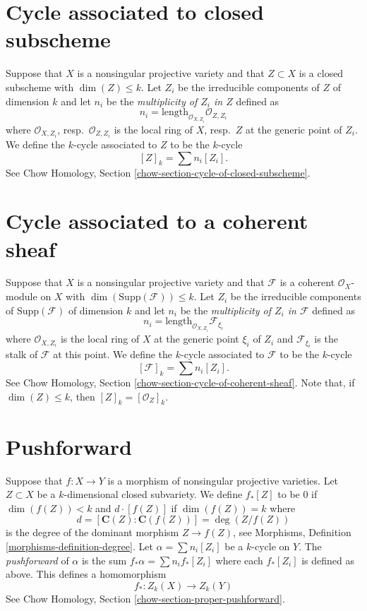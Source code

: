 \section{Cycle associated to closed subscheme}
\label{section-cycle-of-closed}

\noindent
Suppose that $X$ is a nonsingular projective variety and that $Z \subset X$
is a closed subscheme with $\dim(Z) \leq k$. Let $Z_i$ be the irreducible
components of $Z$ of dimension $k$ and let $n_i$ be the
{\it multiplicity of $Z_i$ in $Z$} defined as
$$
n_i = \text{length}_{\mathcal{O}_{X, Z_i}} \mathcal{O}_{Z, Z_i}
$$
where $\mathcal{O}_{X, Z_i}$, resp.\ $\mathcal{O}_{Z, Z_i}$ is the
local ring of $X$, resp.\ $Z$ at the generic point of $Z_i$.
We define the $k$-cycle associated to $Z$ to be the $k$-cycle
$$
[Z]_k = \sum n_i [Z_i].
$$
See Chow Homology, Section \ref{chow-section-cycle-of-closed-subscheme}.


\section{Cycle associated to a coherent sheaf}
\label{section-cycle-of-coherent-sheaf}

\noindent
Suppose that $X$ is a nonsingular projective variety and that $\mathcal{F}$
is a coherent $\mathcal{O}_X$-module on $X$ with
$\dim(\text{Supp}(\mathcal{F})) \leq k$.
Let $Z_i$ be the irreducible components of $\text{Supp}(\mathcal{F})$
of dimension $k$ and let $n_i$ be the
{\it multiplicity of $Z_i$ in $\mathcal{F}$} defined as
$$
n_i = \text{length}_{\mathcal{O}_{X, Z_i}} \mathcal{F}_{\xi_i}
$$
where $\mathcal{O}_{X, Z_i}$ is the
local ring of $X$ at the generic point $\xi_i$ of $Z_i$
and $\mathcal{F}_{\xi_i}$ is the stalk of $\mathcal{F}$ at this point.
We define the $k$-cycle associated to $\mathcal{F}$ to be the $k$-cycle
$$
[\mathcal{F}]_k = \sum n_i [Z_i].
$$
See Chow Homology, Section \ref{chow-section-cycle-of-coherent-sheaf}.
Note that, if $\dim(Z) \leq k$, then $[Z]_k = [\mathcal{O}_Z]_k$.


\section{Pushforward}
\label{section-pushforward}

\noindent
Suppose that $f : X \to Y$ is a morphism of nonsingular projective varieties.
Let $Z \subset X$ be a $k$-dimensional
closed subvariety. We define $f_*[Z]$ to be $0$ if $\dim(f(Z))<k$
and $d \cdot [f(Z)]$ if $\dim(f(Z)) = k$ where
$$
d = [\mathbf{C}(Z) : \mathbf{C}(f(Z))] = \deg(Z/f(Z))
$$
is the degree of the dominant morphism $Z \to f(Z)$, see
Morphisms, Definition \ref{morphisms-definition-degree}.
Let $\alpha = \sum n_i [Z_i]$ be a $k$-cycle on $Y$. The
{\it pushforward} of $\alpha$ is the sum $f_* \alpha = \sum n_i f_*[Z_i]$
where each $f_*[Z_i]$ is defined as above. This defines a homomorphism
$$
f_* : Z_k(X) \longrightarrow Z_k(Y)
$$
See Chow Homology, Section \ref{chow-section-proper-pushforward}.


